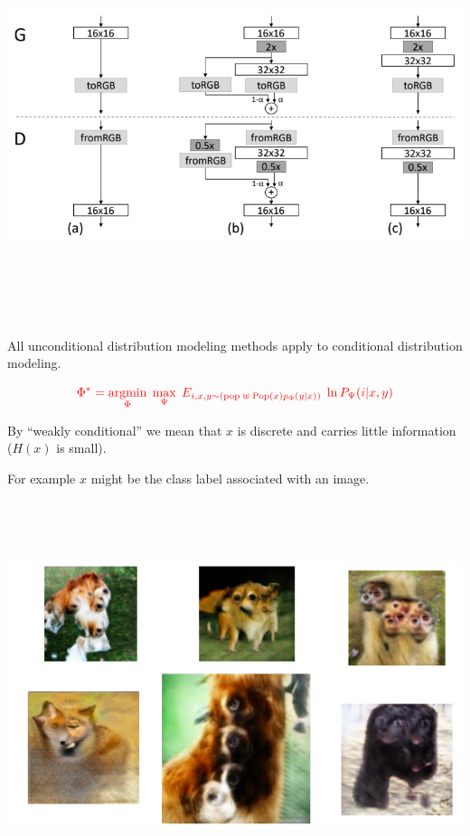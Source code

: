 {
\centerline{\includegraphics[height = 4.5in]{../images/GANprogc}}


All unconditional distribution modeling methods apply to conditional distribution modeling.

$${\color{red} \Phi^* = \operatorname*{argmin}_\Phi \; \max_\Psi \;E_{i,x,y \sim (\mathrm{pop}\; \uplus \;\mathrm{Pop}(x)p_\Phi(y|x))}\;\ln P_\Psi(i|x,y)}$$

By ``weakly conditional'' we mean that $x$ is discrete and carries little information ($H(x)$ is small).

\vfill
For example $x$ might be the class label associated with an image.



\centerline{\includegraphics[height = 4.5in]{../images/BadGAN}}


}
